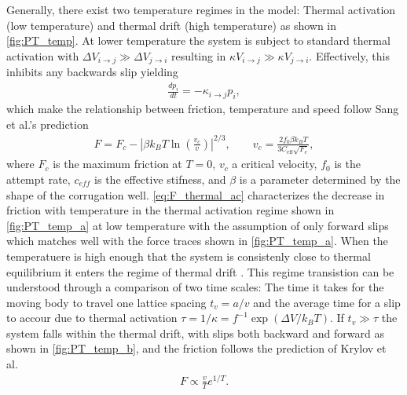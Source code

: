 Generally, there exist two temperature regimes in the model: Thermal activation (low temperature) and thermal drift (high temperature) as shown in \cref{fig:PT_temp}. At lower temperature the system is subject to standard thermal activation with $\Delta V_{i \to j} \gg \Delta V_{j \to i}$ resulting in  $\kappa V_{i \to j} \gg \kappa V_{j \to i}$. Effectively, this inhibits any backwards slip yielding  
\begin{align*}
  \frac{dp_i}{dt} = -\kappa_{i\to j}p_i,
\end{align*}
which make the relationship between friction, temperature and speed follow Sang et al.’s prediction \cite{Sang_2001}
\begin{align}
  F=F_c-\left|\beta k_B T \ln \left(\frac{v_c}{v}\right)\right|^{2 / 3}, \qquad v_c = \frac{2f_0\beta k_B T}{3 C_{\text{eff}} \sqrt{F_c}},
  \label{eq:F_thermal_ac}
\end{align}
where $F_c$ is the maximum friction at $T = 0$, $v_c$ a critical velocity, $f_0$
is the attempt rate, $c_{eff}$ is the effective stifness, and $\beta$ is a
parameter determined by the shape of the corrugation well.
\cref{eq:F_thermal_ac} characterizes the decrease in friction with temperature
in the thermal activation regime shown in \cref{fig:PT_temp_a} at low temperature with the assumption of only forward slips which matches well with the force traces shown in \cref{fig:PT_temp_a}. When the temperatuere is high enough that the system is consistenly close to thermal equilibrium it enters the regime of thermal drift \cite{PhysRevE.71.065101}. This regime transistion can be understood through a comparison of two time scales: The time it takes for the moving body to travel one lattice spacing
$t_v = a/v$ and the average time for a slip to accour due to thermal activation
$\tau = 1/\kappa = f^{-1}\exp(\Delta V / k_BT)$. If $t_v \gg \tau$ the system falls within the thermal drift, with slips both backward and forward as shown in \cref{fig:PT_temp_b}, and the friction follows the prediction of Krylov et
al.\ \cite{Krylow_2007, PhysRevE.71.065101, Jinesh_2008}
\begin{align*}
  F \propto \frac{v}{T}e^{1/T}.
\end{align*}





  
